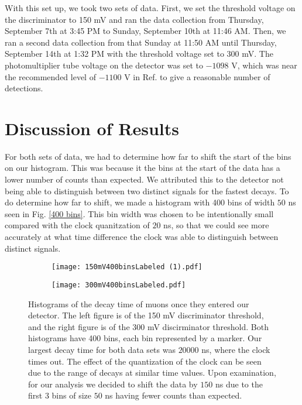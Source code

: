 \documentclass[11pt,letterpaper]{article}
\begin{document}
With this set up, we took two sets of data. First, we set the threshold voltage on the discriminator to 150 mV and ran the data collection from Thursday, September 7th at 3:45 PM to Sunday, September 10th at 11:46 AM. Then, we ran a second data collection from that Sunday at 11:50 AM until Thursday, September 14th at 1:32 PM with the threshold voltage set to $300$ mV. The photomultiplier tube voltage on the detector was set to $-1098$ V, which was near the recommended level of $-1100$ V in Ref. \cite{Coan} to give a reasonable number of detections. 


\section{Discussion of Results}

For both sets of data, we had to determine how far to shift the start of the bins on our histogram. This was because it the bins at the start of the data has a lower number of counts than expected. We attributed this to the detector not being able to distinguish between two distinct signals for the fastest decays. To do determine how far to shift, we made a histogram with 400 bins of width $50$ ns seen in Fig. \ref{400 bins}. This bin width was chosen to be intentionally small compared with the clock quanitzation of $20$ ns, so that we could see more accurately at what time difference the clock was able to distinguish between distinct signals. 

\begin{figure}[h]
    \centering
    \begin{subfigure}[b]{0.45\textwidth}
        \texttt{[image: 150mV400binsLabeled (1).pdf]}
        \label{fig:subfigA}
    \end{subfigure}
    \begin{subfigure}[b]{0.5\textwidth}
        \texttt{[image: 300mV400binsLabeled.pdf]}
        \label{fig:subfigB}
    \end{subfigure}
    \caption{Histograms of the decay time of muons once they entered our detector. The left figure is of the 150 mV discriminator threshold, and the right figure is of the 300 mV discirminator threshold. Both histograms have 400 bins, each bin represented by a marker. Our largest decay time for both data sets was $20000$ ns, where the clock times out. The effect of the quantization of the clock can be seen due to the range of decays at similar time values. Upon examination, for our analysis we decided to shift the data by $150$ ns due to the first 3 bins of size $50$ ns having fewer counts than expected.}
\end{figure}
\label{400 bins}
\end{document}
